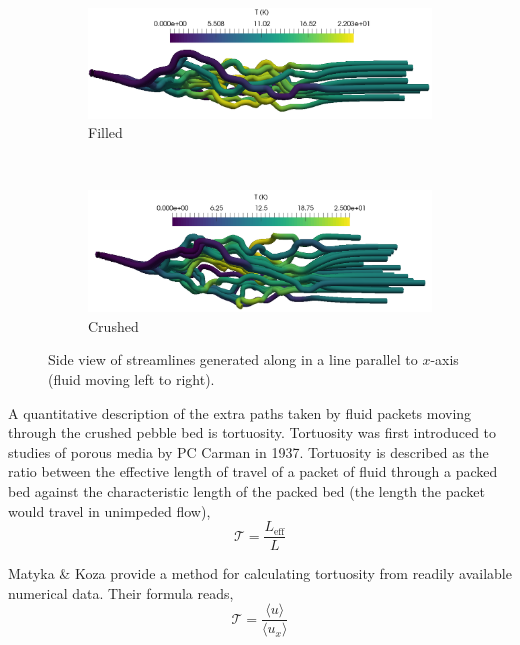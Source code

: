 \begin{figure}[!ht]
    \centering
    \begin{subfigure}[b]{0.44\textwidth}
        \includegraphics[width = \textwidth]{figures/lbm/temperature-streamlines-filled-y-normal}
        \caption{Filled}\label{fig:streamlines-filled-y}
    \end{subfigure}
    ~
    \begin{subfigure}[b]{0.44\textwidth}
        \includegraphics[width = \textwidth]{figures/lbm/temperature-streamlines-crushed-y-normal}
        \caption{Crushed}\label{fig:streamlines-crushed-y}
    \end{subfigure}
    \caption{Side view of streamlines generated along in a line parallel to $x$-axis (fluid moving left to right).}\label{fig:streamlines-y}
\end{figure}
\FloatBarrier

A quantitative description of the extra paths taken by fluid packets moving through the crushed pebble bed is tortuosity. Tortuosity was first introduced to studies of porous media by PC Carman in 1937.\cite{Carman1997} Tortuosity is described as the ratio between the effective length of travel of a packet of fluid through a packed bed against the characteristic length of the packed bed (the length the packet would travel in unimpeded flow),
\begin{equation}
\mathscr{T} = \frac{L_\text{eff}}{L}
\end{equation}

Matyka \& Koza provide a method for calculating tortuosity from readily available numerical data.\cite{Matyka2011} Their formula reads,
\begin{equation}\label{eq:tortuosity}
\mathscr{T} = \frac{\langle u \rangle}{\langle u_x \rangle}
\end{equation}

